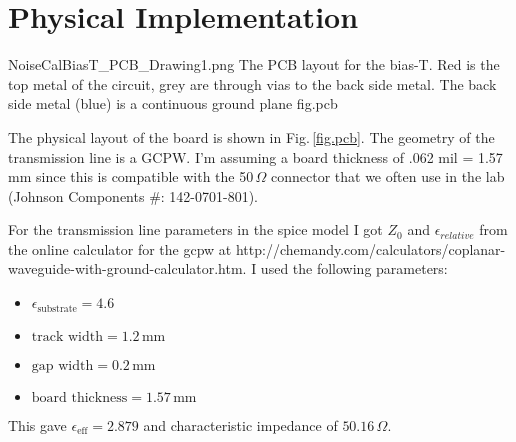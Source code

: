 \begin{comment}
To check how "Microwavy" The board needs to be lets calculate the wavelength at 100 MHz which is roughly the high end of the range that we wish to calibrate.  Since we build the board out of FR4 which has $\epsilon$=4.6 our $\epsilon_{r}$ is (1+4.6)/2 = 2.8 $\epsilon_0$.

In typical operation port 4 of the device is 50 $\Omega$ terminated.

\begin{figure}[ht]
\begin{center}
\begin{circuitikz}
\draw (-1,2)
to [vsourcesin,l=$\text{DAC}$] (0,2);
\draw (-1,0)
to [vsourcesin,l=$\text{Agilent}$] (0,0);
\draw (0,0)
to [TL,l_=$Z_{0}$] (2,0)
to [R=$\text{75 K}\Omega$] (2,2)
to [TL,l_=$Z_{0} \text{=} 50 \Omega$] (0,2);
\draw (2,0)
to [R,l_=$50 \Omega$] (4,0)
to [short] node[ground] {} (5,0);
\draw (2,2)
to [TL,l_=$Z_{0}$] (4,2);
\end{circuitikz}
\end{center}
\end{figure}
\end{comment}

\section{Physical Implementation}

\quickfig{\columnwidth}
{NoiseCalBiasT_PCB_Drawing1.png}
{
The PCB layout for the bias-T.
Red is the top metal of the circuit, grey are through vias to the back side metal.
The back side metal (blue) is a continuous ground plane}
{fig.pcb}

The physical layout of the board is shown in Fig.\,\ref{fig.pcb}.
The geometry of the transmission line is a GCPW.
I'm assuming a board thickness of .062 mil = 1.57 mm since this is compatible with the 50\,$\Omega$ connector that we often use in the lab (Johnson Components \#: 142-0701-801).

For the transmission line parameters in the spice model I got $Z_0$ and $\epsilon_{relative}$ from the online calculator for the gcpw at http://chemandy.com/calculators/coplanar-waveguide-with-ground-calculator.htm.
I used the following parameters:
\begin{itemize}
\item $\epsilon_{\text{substrate}} = 4.6$
\item $\text{track width} = 1.2\,\text{mm}$
\item $\text{gap width} = 0.2\,\text{mm}$
\item $\text{board thickness} = 1.57\,\text{mm}$
\end{itemize}
This gave $\epsilon_{\text{eff}} = 2.879$ and characteristic impedance of  $50.16\,\Omega$.

